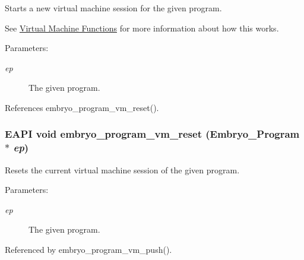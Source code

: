 Starts a new virtual machine session for the given program. 

See \hyperlink{group__Embryo__Program__VM__Group}{Virtual Machine Functions} for more information about how this works.

\begin{Desc}
\item[Parameters:]
\begin{description}
\item[{\em ep}]The given program. \end{description}
\end{Desc}


References embryo\_\-program\_\-vm\_\-reset().\hypertarget{group__Embryo__Program__VM__Group_g6f85080c0f9c9d99190ccf1bdfb60a88}{
\subsubsection{\setlength{\rightskip}{0pt plus 5cm}EAPI void embryo\_\-program\_\-vm\_\-reset (Embryo\_\-Program $\ast$ {\em ep})}}
\label{group__Embryo__Program__VM__Group_g6f85080c0f9c9d99190ccf1bdfb60a88}


Resets the current virtual machine session of the given program. 

\begin{Desc}
\item[Parameters:]
\begin{description}
\item[{\em ep}]The given program. \end{description}
\end{Desc}


Referenced by embryo\_\-program\_\-vm\_\-push().